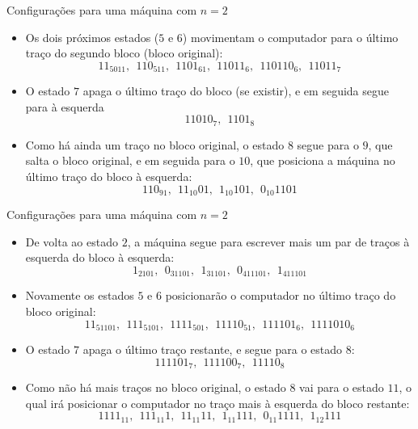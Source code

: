 \begin{frame}[fragile]{Configurações para uma máquina com $n = 2$}

    \begin{itemize}
        \item Os dois próximos estados ($5$ e $6$) movimentam o computador para o último traço
            do segundo bloco (bloco original):
        \[
            11_5011,\ \ 110_511,\ \ 1101_61,\ \ 11011_6,\ \ 110110_6,\ \ 11011_7
        \]

        \item O estado $7$ apaga o último traço do bloco (se existir), e em seguida segue para
            à esquerda
        \[
            11010_7,\ \ 1101_8
        \]

        \item Como há ainda um traço no bloco original, o estado $8$ segue para o $9$, que
            salta o bloco original, e em seguida para o $10$, que posiciona a máquina no último
            traço do bloco à esquerda:
        \[
            110_91,\ \ 11_{10}01,\ \ 1_{10}101,\ \ 0_{10}1101
        \]
    \end{itemize}

\end{frame}

\begin{frame}[fragile]{Configurações para uma máquina com $n = 2$}

    \begin{itemize}
        \item De volta ao estado $2$, a máquina segue para escrever mais um par de traços à 
            esquerda do bloco à esquerda:
        \[
            1_2101,\ \ 0_31101,\ \ 1_31101,\ \ 0_411101,\ \ 1_411101
        \]

        \item Novamente os estados $5$ e $6$ posicionarão o computador no último traço do bloco
            original:
        \[
            11_51101,\ \ 111_5101,\ \ 1111_501,\ \ 11110_51, \ \ 111101_6, \ \ 1111010_6
        \]

        \item O estado $7$ apaga o último traço restante, e segue para o estado $8$:
        \[
            111101_7, \ \ 111100_7, \ \ 11110_8
        \]

        \item Como não há mais traços no bloco original, o estado $8$ vai para o estado $11$, o
            qual irá posicionar o computador no traço mais à esquerda do bloco restante:
        \[
            1111_{11},\ \ 111_{11}1,\ \ 11_{11}11,\ \ 1_{11}111,\ \ 0_{11}1111,\ \ 1_{12}111
        \]
    \end{itemize}

\end{frame}

